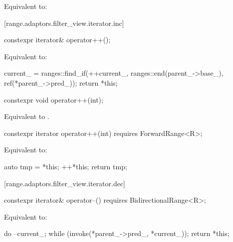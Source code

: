 \begin{addedblock}
\begin{itemdescr}
\pnum
\effects
Equivalent to: 
\end{itemdescr}

[range.adaptors.filter_view.iterator.inc]{}

%
\begin{itemdecl}
constexpr iterator& operator++();
\end{itemdecl}

\begin{itemdescr}
\pnum
\effects Equivalent to:
\begin{codeblock}
current_ = ranges::find_if(++current_, ranges::end(parent_->base_), ref(*parent_->pred_));
return *this;
\end{codeblock}
\end{itemdescr}

%
\begin{itemdecl}
constexpr void operator++(int);
\end{itemdecl}

\begin{itemdescr}
\pnum
\effects Equivalent to .
\end{itemdescr}

%
\begin{itemdecl}
constexpr iterator operator++(int) requires ForwardRange<R>;
\end{itemdecl}

\begin{itemdescr}
\pnum
\effects Equivalent to:
\begin{codeblock}
auto tmp = *this;
++*this;
return tmp;
\end{codeblock}
\end{itemdescr}

[range.adaptors.filter_view.iterator.dec]{}

%
\begin{itemdecl}
constexpr iterator& operator--() requires BidirectionalRange<R>;
\end{itemdecl}

\begin{itemdescr}
\pnum
\effects Equivalent to:
\begin{codeblock}
do
  --current_;
while (invoke(*parent_->pred_, *current_));
return *this;
\end{codeblock}
\end{itemdescr}


\end{addedblock}
